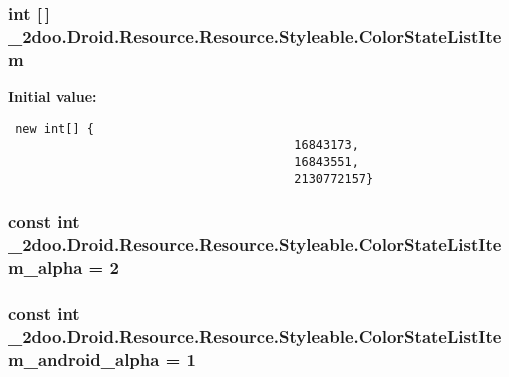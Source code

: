 \hypertarget{class__2doo_1_1_droid_1_1_resource_1_1_styleable_e3653c6424db84304cb77dff35a11f71}{
\subsubsection[{ColorStateListItem}]{\setlength{\rightskip}{0pt plus 5cm}int \mbox{[}$\,$\mbox{]} \_\-2doo.Droid.Resource.Resource.Styleable.ColorStateListItem}}
\label{class__2doo_1_1_droid_1_1_resource_1_1_styleable_e3653c6424db84304cb77dff35a11f71}


\textbf{Initial value:}

\begin{Code}\begin{verbatim} new int[] {
                                        16843173,
                                        16843551,
                                        2130772157}
\end{verbatim}
\end{Code}
\hypertarget{class__2doo_1_1_droid_1_1_resource_1_1_styleable_fbd3f6e8d5b1664d77e0728ba0d37822}{
\subsubsection[{ColorStateListItem\_\-alpha}]{\setlength{\rightskip}{0pt plus 5cm}const int \_\-2doo.Droid.Resource.Resource.Styleable.ColorStateListItem\_\-alpha = 2}}
\label{class__2doo_1_1_droid_1_1_resource_1_1_styleable_fbd3f6e8d5b1664d77e0728ba0d37822}


\hypertarget{class__2doo_1_1_droid_1_1_resource_1_1_styleable_91c980a45c030ac379b12da77d2bed00}{
\subsubsection[{ColorStateListItem\_\-android\_\-alpha}]{\setlength{\rightskip}{0pt plus 5cm}const int \_\-2doo.Droid.Resource.Resource.Styleable.ColorStateListItem\_\-android\_\-alpha = 1}}
\label{class__2doo_1_1_droid_1_1_resource_1_1_styleable_91c980a45c030ac379b12da77d2bed00}


